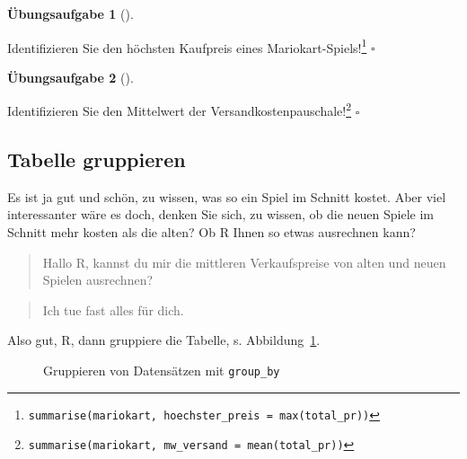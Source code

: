\documentclass[
  letterpaper,
  twoside,
  open=any]{scrbook}
\theoremstyle{definition}
\theoremstyle{definition}
\newtheorem{exercise}{Übungsaufgabe}[chapter]
\theoremstyle{definition}
\theoremstyle{remark}
\begin{document}
\begin{exercise}[]\protect\hypertarget{exr-summarise}{}\label{exr-summarise}

Identifizieren Sie den höchsten Kaufpreis eines
Mariokart-Spiels!\footnote{\texttt{summarise(mariokart,\ hoechster\_preis\ =\ max(total\_pr))}}
\(\square\)

\end{exercise}

\begin{exercise}[]\protect\hypertarget{exr-summarise2}{}\label{exr-summarise2}

Identifizieren Sie den Mittelwert der Versandkostenpauschale!\footnote{\texttt{summarise(mariokart,\ mw\_versand\ =\ mean(total\_pr))}}
\(\square\)

\end{exercise}

\subsection{Tabelle gruppieren}\label{tabelle-gruppieren}

Es ist ja gut und schön, zu wissen, was so ein Spiel im Schnitt kostet.
Aber viel interessanter wäre es doch, denken Sie sich, zu wissen, ob die
neuen Spiele im Schnitt mehr kosten als die alten? Ob R Ihnen so etwas
ausrechnen kann?

\begin{quote}
{} Hallo R, kannst du mir die mittleren Verkaufspreise
von alten und neuen Spielen ausrechnen?
\end{quote}

\begin{quote}
{} Ich tue fast alles für dich. {}
\end{quote}

Also gut, R, dann gruppiere die Tabelle, s. Abbildung~\ref{fig-group}.

\begin{figure}


\caption{\label{fig-group}Gruppieren von Datensätzen mit
\texttt{group\_by}}

\end{figure}%
\end{document}
